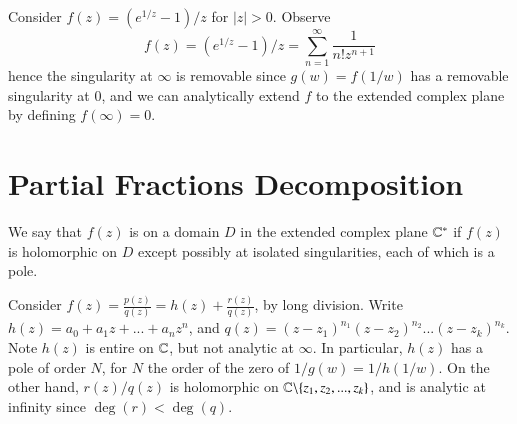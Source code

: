 \documentclass[12pt, a4paper, oneside, openright, titlepage]{book}
\begin{document}
\begin{eg}
    Consider $f(z) = (e^{1/z}-1)/z$ for $|z| > 0$. Observe \begin{equation*}
        f(z) = (e^{1/z}-1)/z = \sum_{n=1}^{\infty}\frac{1}{n!z^{n+1}}
    \end{equation*}
    hence the singularity at $\infty$ is removable since $g(w) = f(1/w)$ has a removable singularity at $0$, and we can analytically extend $f$ to the extended complex plane by defining $f(\infty) = 0$.
\end{eg}



\section{Partial Fractions Decomposition}

\begin{defn}
    We say that $f(z)$ is  on a domain $D$ in the extended complex plane $\mathbb C^*$ if $f(z)$ is holomorphic on $D$ except possibly at isolated singularities, each of which is a pole.
\end{defn}

\begin{eg}
    Consider $f(z) = \frac{p(z)}{q(z)} = h(z)+\frac{r(z)}{q(z)}$, by long division. Write $h(z) = a_0+a_1z+...+a_nz^n$, and $q(z) = (z-z_1)^{n_1}(z-z_2)^{n_2}...(z-z_k)^{n_k}$. Note $h(z)$ is entire on $\mathbb C$, but not analytic at $\infty$. In particular, $h(z)$ has a pole of order $N$, for $N$ the order of the zero of $1/g(w) = 1/h(1/w)$. On the other hand, $r(z)/q(z)$ is holomorphic on $\mathbb C\backslash\{z_1,z_2,...,z_k\}$, and is analytic at infinity since $\deg(r) < \deg(q)$.
\end{eg}
\end{document}
